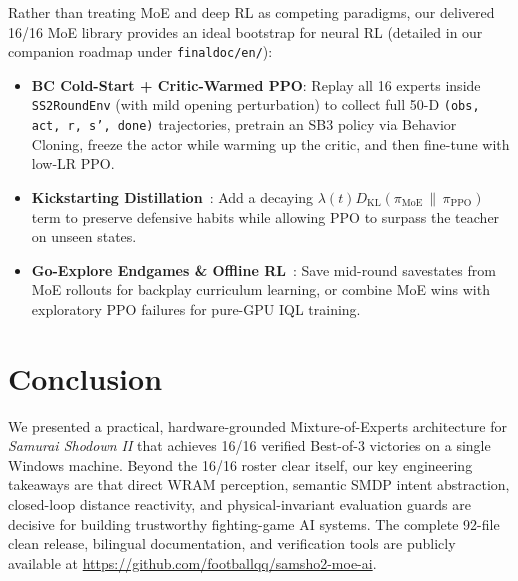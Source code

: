 \documentclass[10pt,twocolumn]{article}
\begin{document}
Rather than treating MoE and deep RL as competing paradigms, our delivered 16/16 MoE library provides an ideal bootstrap for neural RL (detailed in our companion roadmap under \texttt{finaldoc/en/}):
\begin{itemize}
    \item \textbf{BC Cold-Start + Critic-Warmed PPO}: Replay all 16 experts inside \texttt{SS2RoundEnv} (with mild opening perturbation) to collect full 50-D \texttt{(obs, act, r, s', done)} trajectories, pretrain an SB3 policy via Behavior Cloning, freeze the actor while warming up the critic, and then fine-tune with low-LR PPO.
    \item \textbf{Kickstarting Distillation}~\cite{schmitt2018kickstarting}: Add a decaying $\lambda(t) D_{\text{KL}}(\pi_{\text{MoE}} \,\|\, \pi_{\text{PPO}})$ term to preserve defensive habits while allowing PPO to surpass the teacher on unseen states.
    \item \textbf{Go-Explore Endgames \& Offline RL}~\cite{ecoffet2021goexplore,kostrikov2022iql}: Save mid-round savestates from MoE rollouts for backplay curriculum learning, or combine MoE wins with exploratory PPO failures for pure-GPU IQL training.
\end{itemize}

\section{Conclusion}
We presented a practical, hardware-grounded Mixture-of-Experts architecture for \textit{Samurai Shodown II} that achieves 16/16 verified Best-of-3 victories on a single Windows machine. Beyond the 16/16 roster clear itself, our key engineering takeaways are that direct WRAM perception, semantic SMDP intent abstraction, closed-loop distance reactivity, and physical-invariant evaluation guards are decisive for building trustworthy fighting-game AI systems. The complete 92-file clean release, bilingual documentation, and verification tools are publicly available at \url{https://github.com/footballqq/samsho2-moe-ai}.
\end{document}
